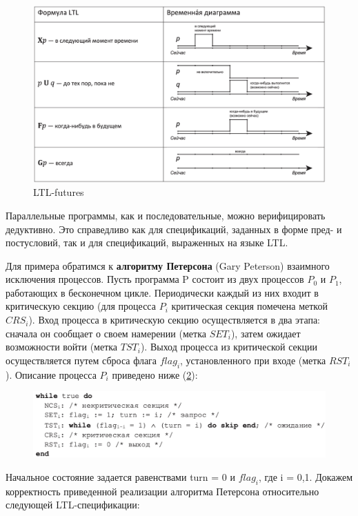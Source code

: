\begin{figure}[H]
  \includegraphics[width=\linewidth]{pics/ltl-timescape.png}
  \caption{LTL-futures}
  \label{LTL-futures}
\end{figure}


Параллельные программы, как и последовательные, можно верифицировать дедуктивно. 
Это справедливо как для спецификаций, заданных в форме пред- и постусловий, так и для спецификаций, выраженных на языке LTL.

Для примера обратимся к \textbf{алгоритму Петерсона} (Gary Peterson) взаимного исключения процессов. 
Пусть программа P состоит из двух процессов $P_0$ и $P_1$, работающих в бесконечном цикле. 
Периодически каждый из них входит в критическую секцию (для процесса $P_i$ критическая секция помечена меткой $CRS_i$). 
Вход процесса в критическую секцию осуществляется в два этапа: сначала он сообщает о своем намерении (метка $ SET_i$), затем ожидает возможности войти (метка $TST_i$). 
Выход процесса из критической секции осуществляется путем сброса флага $flag_i$, установленного при входе (метка $RST_i$). Описание процесса $P_i$ приведено ниже (\ref{LTL-code}):

\begin{figure}[H]
  \includegraphics[width=\linewidth]{pics/ltl-sample-code.png}
  \caption{}
  \label{LTL-code}
\end{figure}

Начальное состояние задается равенствами turn = 0 и $flag_i$, где i = 0,1. Докажем корректность приведенной реализации алгоритма Петерсона относительно следующей LTL-спецификации:

